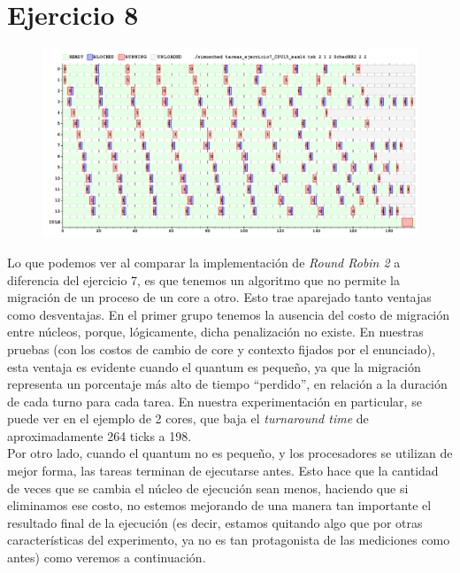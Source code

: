 \section{Ejercicio 8}

\begin{figure}[h]
	\centering                                                       
	\includegraphics[width=450pt]{./figs/ejercicio8_2cores_quantum2.png}
\end{figure}

Lo que podemos ver al comparar la implementación de \textit{Round Robin 2} a diferencia del ejercicio 7, es que tenemos un algoritmo que no permite la migración de un proceso de un core a otro. Esto trae aparejado tanto ventajas como desventajas. En el primer grupo tenemos la ausencia del costo de migración entre núcleos, porque, lógicamente, dicha penalización no existe. En nuestras pruebas (con los costos de cambio de core y contexto fijados por el enunciado), esta ventaja es evidente cuando el quantum es pequeño, ya que la migración representa un porcentaje más alto de tiempo ``perdido'', en relación a la duración de cada turno para cada tarea. En nuestra experimentación en particular, se puede ver en el ejemplo de 2 cores, que baja el \textit{turnaround time} de aproximadamente 264 ticks a  198.\\
\indent Por otro lado, cuando el quantum no es pequeño, y los procesadores se utilizan de mejor forma, las tareas terminan de ejecutarse antes. Esto hace que la cantidad de veces que se cambia el núcleo de ejecución sean menos, haciendo que si eliminamos ese costo, no estemos mejorando de una manera tan importante el resultado final de la ejecución (es decir, estamos quitando algo que por otras características del experimento, ya no es tan protagonista de las mediciones como antes) como veremos a continuación.

